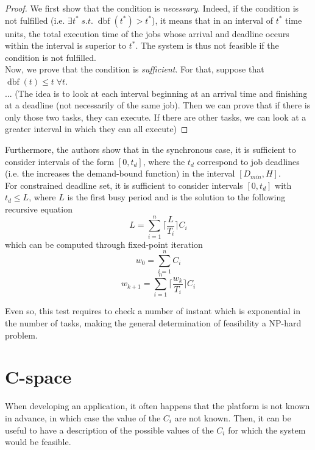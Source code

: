 \documentclass[a4paper,10pt]{article}
\newcommand{\dbf}[1]{\operatorname{dbf}(#1)}
\begin{document}
\begin{proof}
	We first show that the condition is \emph{necessary}. Indeed, if the condition is not fulfilled (i.e. $\exists t^* \; s.t. \; \dbf{t^*} > t^*$), it means that in an interval of $t^*$ time units, the total execution time of the jobs whose arrival and deadline occurs within the interval is superior to $t^*$. The system is thus not feasible if the condition is not fulfilled.\\

	Now, we prove that the condition is \emph{sufficient}. For that, suppose that $\dbf{t} \leq t \; \forall t$.\\

	... (The idea is to look at each interval beginning at an arrival time and finishing at a deadline (not necessarily of the same job). Then we can prove that if there is only those two tasks, they can execute. If there are other tasks, we can look at a greater interval in which they can all execute)

\end{proof}

Furthermore, the authors show that in the synchronous case, it is sufficient to consider intervals of the form $[0, t_d]$, where the $t_d$ correspond to job deadlines (i.e. the increases the demand-bound function) in the interval $\left[ D_{min}, H \right]$.\\

For constrained deadline set, it is sufficient to consider intervals $[0, t_d]$ with $t_d \leq L$, where $L$ is the first busy period and is the solution to the following recursive equation $$L = \sum_{i=1}^{n} \lceil \frac{L}{T_i} \rceil C_i$$ which can be computed through fixed-point iteration $$w_0 = \sum_{i=1}^{n} C_i$$ $$w_{k+1} = \sum_{i=1}^{n} \lceil \frac{w_k}{T_i} \rceil C_i$$

Even so, this test requires to check a number of instant which is exponential in the number of tasks, making the general determination of feasibility a NP-hard problem.

\section{C-space}
When developing an application, it often happens that the platform is not known in advance, in which case the value of the $C_i$ are not known. Then, it can be useful to have a description of the possible values of the $C_i$ for which the system would be feasible.
\end{document}
